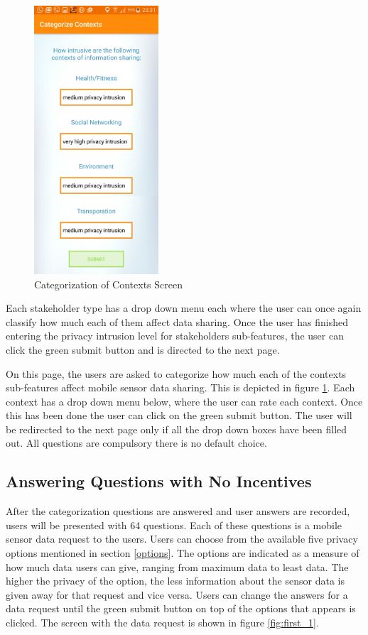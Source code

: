 \begin{figure}[ht!]
\centering
\includegraphics[width=0.4\linewidth, height=10cm]{./images/cat_contexts}
\caption{Categorization of Contexts Screen}
\label{fig:cat_co}
\end{figure}

Each stakeholder type has a drop
down menu each where the user can once again classify how much each of them affect data sharing.
Once the user has finished entering the privacy intrusion level for stakeholders sub-features, the user can click the green submit button and is directed to the next page.


On this page, the users are asked to categorize how much each of the contexts sub-features affect mobile sensor data sharing. This is depicted in figure \ref{fig:cat_co}. Each context has a drop down menu below, where the user can rate each context. Once this has been done the user can click on the green submit button. The user will be redirected to the next page only if all the drop down boxes have been filled out. All questions are compulsory there is no default choice.

\subsection{Answering Questions with No Incentives}  \label{quest_wi}
After the categorization questions are answered and user answers are recorded, users will be presented with 64 questions. Each of these questions is a mobile sensor data request
to the users. Users can choose from the available five privacy options mentioned in section \ref{options}. The options are indicated as a measure of how much data users can give, ranging from maximum data to least data. The higher the privacy of the option, the less information about the sensor data is given away for that request and vice versa. Users can change the answers for a data request until the green submit button on top of the options that appears is clicked. The screen with the data request is shown in figure \ref{fig:first_1}. 

